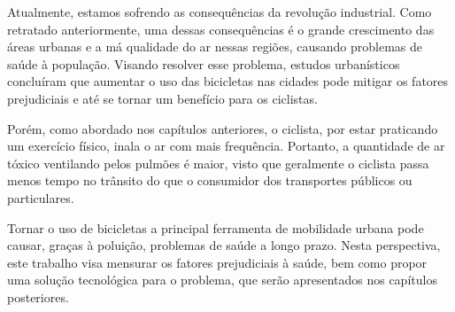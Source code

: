 
Atualmente, estamos sofrendo as consequências da revolução industrial. Como retratado anteriormente, 
uma dessas consequências é o grande crescimento das áreas urbanas e a má qualidade do ar nessas 
regiões, causando problemas de saúde à população. Visando resolver esse problema, estudos 
urbanísticos concluíram que aumentar o uso das bicicletas nas cidades pode mitigar os fatores 
prejudiciais e até se tornar um benefício para os ciclistas. 

Porém, como abordado nos capítulos anteriores, o ciclista, por estar praticando um exercício físico, 
inala o ar com mais frequência. Portanto, a quantidade de ar tóxico ventilando pelos pulmões é maior, 
visto que geralmente o ciclista passa menos tempo no trânsito do que o consumidor dos transportes 
públicos ou particulares.

Tornar o uso de bicicletas a principal ferramenta de mobilidade urbana pode causar, graças à 
poluição, problemas de saúde a longo prazo. Nesta perspectiva, este trabalho visa mensurar os fatores 
prejudiciais à saúde, bem como propor uma solução tecnológica para o problema,  que serão 
apresentados nos capítulos posteriores. 
